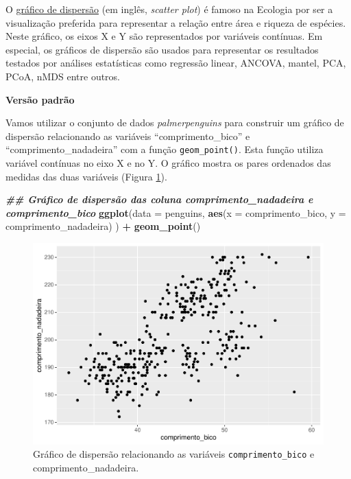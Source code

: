 \documentclass[
]{article}
\newenvironment{Shaded}{\begin{snugshade}}{\end{snugshade}}
\newcommand{\AttributeTok}[1]{\textcolor[rgb]{0.13,0.29,0.53}{#1}}
\newcommand{\DocumentationTok}[1]{\textcolor[rgb]{0.56,0.35,0.01}{\textbf{\textit{#1}}}}
\newcommand{\FunctionTok}[1]{\textcolor[rgb]{0.13,0.29,0.53}{\textbf{#1}}}
\newcommand{\NormalTok}[1]{#1}
\newcommand{\SpecialCharTok}[1]{\textcolor[rgb]{0.81,0.36,0.00}{\textbf{#1}}}
\begin{document}
O \href{https://datavizproject.com/data-type/scatter-plot/}{gráfico de dispersão} (em inglês, \emph{scatter plot}) é famoso na Ecologia por ser a visualização preferida para representar a relação entre área e riqueza de espécies. Neste gráfico, os eixos X e Y são representados por variáveis contínuas. Em especial, os gráficos de dispersão são usados para representar os resultados testados por análises estatísticas como regressão linear, ANCOVA, mantel, PCA, PCoA, nMDS entre outros.

\textbf{Versão padrão}

Vamos utilizar o conjunto de dados \emph{palmerpenguins} para construir um gráfico de dispersão relacionando as variáveis ``comprimento\_bico'' e ``comprimento\_nadadeira'' com a função \texttt{geom\_point()}. Esta função utiliza variável contínuas no eixo X e no Y. O gráfico mostra os pares ordenados das medidas das duas variáveis (Figura \ref{fig:fig-scatter}).

\begin{Shaded}
\begin{Highlighting}[]
\DocumentationTok{\#\# Gráfico de dispersão das coluna comprimento\_nadadeira e comprimento\_bico}
\FunctionTok{ggplot}\NormalTok{(}\AttributeTok{data =}\NormalTok{ penguins, }
       \FunctionTok{aes}\NormalTok{(}\AttributeTok{x =}\NormalTok{ comprimento\_bico, }\AttributeTok{y =}\NormalTok{ comprimento\_nadadeira)}
\NormalTok{       ) }\SpecialCharTok{+}
    \FunctionTok{geom\_point}\NormalTok{()}
\end{Highlighting}
\end{Shaded}

\begin{figure}
\centering
\includegraphics{epr_files/figure-latex/fig-scatter-1.pdf}
\caption{\label{fig:fig-scatter}Gráfico de dispersão relacionando as variáveis \texttt{comprimento\_bico} e comprimento\_nadadeira.}
\end{figure}
\end{document}
